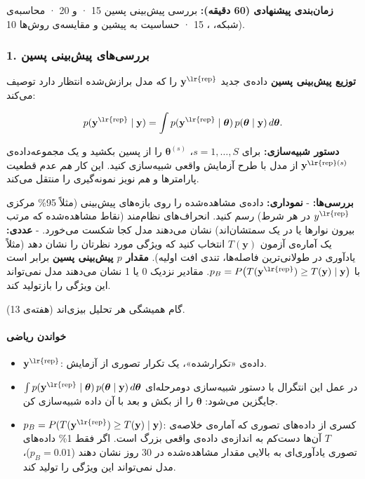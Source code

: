\textbf{زمان‌بندی پیشنهادی (60 دقیقه):} بررسی پیش‌بینی پسین 15 ·
 و  20 · محاسبه‌ی  (شبکه، ،  15 · حساسیت به پیشین و
مقایسه‌ی روش‌ها 10.

\subsubsection{1. بررسی‌های پیش‌بینی پسین}

\textbf{توزیع پیش‌بینی پسین} داده‌ی جدید \(\mathbf{y}^{\text{\lr{rep}}}\) را که
مدل برازش‌شده انتظار دارد توصیف می‌کند:

\[
p(\mathbf{y}^{\text{\lr{rep}}} \mid \mathbf{y}) = \int p(\mathbf{y}^{\text{\lr{rep}}} \mid \boldsymbol\theta)\, p(\boldsymbol\theta \mid \mathbf{y})\, d\boldsymbol\theta.
\]

\textbf{دستور شبیه‌سازی:} برای \(s = 1, \dots, S\)،
\(\boldsymbol\theta^{(s)}\) را از پسین بکشید و یک مجموعه‌داده‌ی
\(\mathbf{y}^{\text{\lr{rep}}(s)}\) از مدل با طرح آزمایش واقعی شبیه‌سازی کنید.
این کار \emph{هم} عدم قطعیت پارامترها و \emph{هم} نویز نمونه‌گیری را
منتقل می‌کند.

\textbf{بررسی‌ها:} - \textbf{نموداری:} داده‌ی مشاهده‌شده را روی بازه‌های
پیش‌بینی (مثلاً 95\% مرکزی \(y^{\text{\lr{rep}}}\) در هر شرط) رسم کنید.
انحراف‌های نظام‌مند (نقاط مشاهده‌شده که مرتب بیرون نوارها یا در یک
سمتشان‌اند) نشان می‌دهند مدل کجا شکست می‌خورد. - \textbf{عددی:} یک آماره‌ی
آزمون \(T(\mathbf{y})\) انتخاب کنید که ویژگی مورد نظرتان را نشان دهد
(مثلاً یادآوری در طولانی‌ترین فاصله‌ها، تندی افت اولیه). \textbf{مقدار
\(p\) پیش‌بینی پسین} برابر است با
\(p_B = P\big(T(\mathbf{y}^{\text{\lr{rep}}}) \ge T(\mathbf{y}) \mid \mathbf{y}\big)\).
مقادیر نزدیک 0 یا 1 نشان می‌دهند مدل نمی‌تواند این ویژگی را بازتولید کند.

گام همیشگی هر تحلیل بیزی‌اند (هفته‌ی 13).

\paragraph{خواندن ریاضی}

\begin{itemize}
\tightlist
\item
  \(\mathbf{y}^{\text{\lr{rep}}}\): داده‌ی «تکرارشده»، یک تکرار تصوری از
  آزمایش.
\item

  \(\int p(\mathbf{y}^{\text{\lr{rep}}} \mid \boldsymbol\theta)\, p(\boldsymbol\theta \mid \mathbf{y})\, d\boldsymbol\theta\)
  در عمل این انتگرال با دستور شبیه‌سازی دومرحله‌ای جایگزین می‌شود:
  \(\boldsymbol\theta\) را از  بکش و بعد با آن داده
  شبیه‌سازی کن.
\item
  \(p_B = P(T(\mathbf{y}^{\text{\lr{rep}}}) \ge T(\mathbf{y}) \mid \mathbf{y})\):
  کسری از داده‌های تصوری که آماره‌ی خلاصه‌ی \(T\) آن‌ها دست‌کم به اندازه‌ی
  داده‌ی واقعی بزرگ است. اگر فقط 1\% داده‌های تصوری یادآوری‌ای به بالایی
  مقدار مشاهده‌شده در 30 روز نشان دهند (\(p_B = 0.01\))، مدل نمی‌تواند این
  ویژگی را تولید کند.
\end{itemize}

